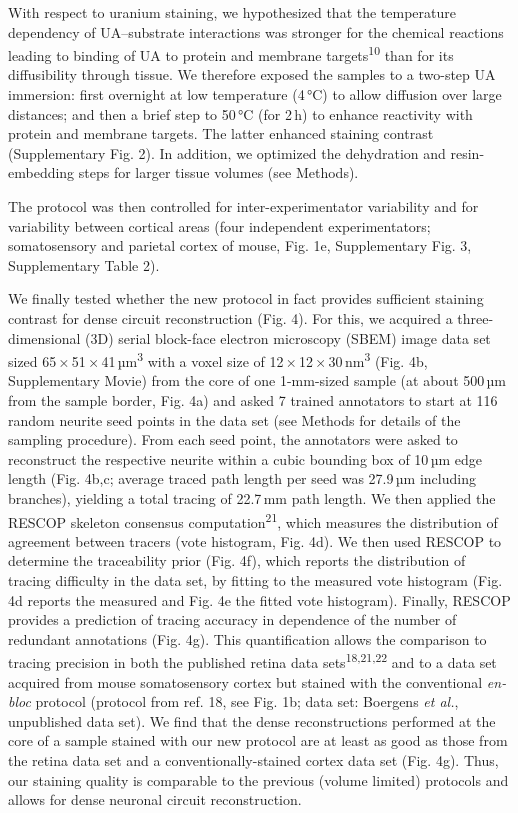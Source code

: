 \documentclass{article}
\begin{document}
With respect to uranium staining, we hypothesized that the temperature dependency of UA–substrate interactions was stronger for the chemical reactions leading to binding of UA to protein and membrane targets\textsuperscript{10} than for its diffusibility through tissue. We therefore exposed the samples to a two-step UA immersion: first overnight at low temperature (4\,°C) to allow diffusion over large distances; and then a brief step to 50\,°C (for 2\,h) to enhance reactivity with protein and membrane targets. The latter enhanced staining contrast (Supplementary Fig. 2). In addition, we optimized the dehydration and resin-embedding steps for larger tissue volumes (see Methods).

The protocol was then controlled for inter-experimentator variability and for variability between cortical areas (four independent experimentators; somatosensory and parietal cortex of mouse, Fig. 1e, Supplementary Fig. 3, Supplementary Table 2).

We finally tested whether the new protocol in fact provides sufficient staining contrast for dense circuit reconstruction (Fig. 4). For this, we acquired a three-dimensional (3D) serial block-face electron microscopy (SBEM) image data set sized 65\,×\,51\,×\,41\,µm\textsuperscript{3} with a voxel size of 12\,×\,12\,×\,30\,nm\textsuperscript{3} (Fig. 4b, Supplementary Movie) from the core of one 1-mm-sized sample (at about 500\,µm from the sample border, Fig. 4a) and asked 7 trained annotators to start at 116 random neurite seed points in the data set (see Methods for details of the sampling procedure). From each seed point, the annotators were asked to reconstruct the respective neurite within a cubic bounding box of 10\,µm edge length (Fig. 4b,c; average traced path length per seed was 27.9\,µm including branches), yielding a total tracing of 22.7\,mm path length. We then applied the RESCOP skeleton consensus computation\textsuperscript{21}, which measures the distribution of agreement between tracers (vote histogram, Fig. 4d). We then used RESCOP to determine the traceability prior (Fig. 4f), which reports the distribution of tracing difficulty in the data set, by fitting to the measured vote histogram (Fig. 4d reports the measured and Fig. 4e the fitted vote histogram). Finally, RESCOP provides a prediction of tracing accuracy in dependence of the number of redundant annotations (Fig. 4g). This quantification allows the comparison to tracing precision in both the published retina data sets\textsuperscript{18,21,22} and to a data set acquired from mouse somatosensory cortex but stained with the conventional \emph{en-bloc} protocol (protocol from ref. 18, see Fig. 1b; data set: Boergens \emph{et al.}, unpublished data set). We find that the dense reconstructions performed at the core of a sample stained with our new protocol are at least as good as those from the retina data set and a conventionally-stained cortex data set (Fig. 4g). Thus, our staining quality is comparable to the previous (volume limited) protocols and allows for dense neuronal circuit reconstruction.
\end{document}
